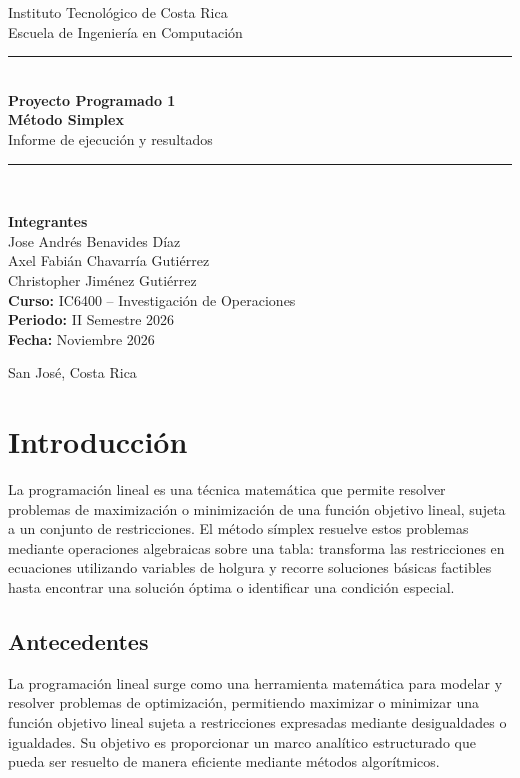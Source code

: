 \documentclass[11pt,oneside]{report}
\begin{document}
\begin{titlepage}
\centering
\vspace*{1.2cm}
{\Large Instituto Tecnológico de Costa Rica}\\[0.3cm]
{\large Escuela de Ingeniería en Computación}\\[1.7cm]
{\rule{0.85\textwidth}{1.2pt}}\\[0.8cm]
{\Huge\bfseries Proyecto Programado 1}\\[0.35cm]
{\LARGE\bfseries Método Simplex}\\[0.8cm]
{\large Informe de ejecución y resultados}\\[0.5cm]
{\rule{0.55\textwidth}{1pt}}\\[1.2cm]
\begin{minipage}{0.82\textwidth}\centering\large
\textbf{Integrantes}\\[0.35cm]
Jose Andrés Benavides Díaz\\
Axel Fabián Chavarría Gutiérrez\\
Christopher Jiménez Gutiérrez\\[0.8cm]
\textbf{Curso:} IC6400 -- Investigación de Operaciones\\
\textbf{Periodo:} II Semestre 2026\\
\textbf{Fecha:} Noviembre 2026
\end{minipage}\vfill
{\large San José, Costa Rica}\\
\end{titlepage}
\tableofcontents\clearpage
\chapter{Introducción}
La programación lineal es una técnica matemática que permite resolver problemas de maximización o minimización de una función objetivo lineal, sujeta a un conjunto de restricciones. El método símplex resuelve estos problemas mediante operaciones algebraicas sobre una tabla: transforma las restricciones en ecuaciones utilizando variables de holgura y recorre soluciones básicas factibles hasta encontrar una solución óptima o identificar una condición especial.

\section{Antecedentes}
La programación lineal surge como una herramienta matemática para modelar y resolver problemas de optimización, permitiendo maximizar o minimizar una función objetivo lineal sujeta a restricciones expresadas mediante desigualdades o igualdades. Su objetivo es proporcionar un marco analítico estructurado que pueda ser resuelto de manera eficiente mediante métodos algorítmicos.
\end{document}
